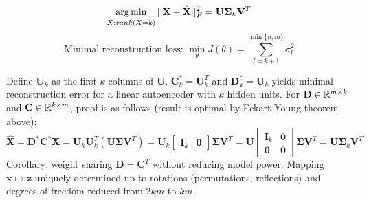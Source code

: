 \documentclass[12pt]{article}
\begin{document}
\[ \operatorname*{arg\,min}_{\hat{X}:rank(\hat{X}=k)} ||\mathbf{X} - \hat{\mathbf{X}}||^2_F = \mathbf{U}\mathbf{\Sigma}_k \mathbf{V}^T\]
\[ \text{Minimal reconstruction loss: } \min_{\theta} J(\theta) = \sum_{l=k+1}^{\min\{n,m\}} \sigma_l^2 \]
\par Define $\mathbf{U}_k$ as the first $k$ columns of $\mathbf{U}$. $\mathbf{C}_k^* = \mathbf{U}_k^T$ and $\mathbf{D}_k^* = \mathbf{U}_k$ yields minimal reconstruction error for a linear autoencoder with $k$ hidden units. For $\mathbf{D}\in \mathbb{R}^{m\times k}$ and $\mathbf{C}\in \mathbb{R}^{k\times m}$, proof is as follows (result is optimal by Eckart-Young theorem above):
\[
\hat{\mathbf{X}} = \mathbf{D}^*\mathbf{C}^*\mathbf{X}
= \mathbf{U}_k \mathbf{U}_k^T \left( \mathbf{U}\mathbf{\Sigma} \mathbf{V}^T \right) = \mathbf{U}_k \begin{bmatrix}\mathbf{I}_k & \mathbf{0} \end{bmatrix} \mathbf{\Sigma} \mathbf{V}^T
= \mathbf{U} \begin{bmatrix} \mathbf{I}_k & \mathbf{0} \\ \mathbf{0} & \mathbf{0} \end{bmatrix} \mathbf{\Sigma} \mathbf{V}^T = \mathbf{U}\mathbf{\Sigma}_k \mathbf{V}^T
\]
Corollary: weight sharing $\mathbf{D} = \mathbf{C}^T$ without reducing model power. Mapping $\mathbf{x} \mapsto \mathbf{z}$ uniquely determined up to rotations (permutations, reflections) and degrees of freedom reduced from $2km$ to $km$.
\end{document}
